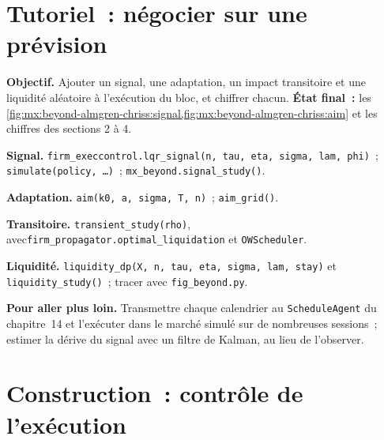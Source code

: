\section{Tutoriel~: négocier sur une prévision}\label{tut:mx:beyond-almgren-chriss:tut}

\begin{tutorial}
\textbf{Objectif.} Ajouter un signal, une adaptation, un impact transitoire et une liquidité aléatoire à l'exécution du bloc, et chiffrer chacun.
\textbf{État final~:} les \cref{fig:mx:beyond-almgren-chriss:signal,fig:mx:beyond-almgren-chriss:aim} et les chiffres des sections 2 à 4.
\begin{tutsteps}
\item \textbf{Signal.} \texttt{firm\_execcontrol.lqr\_signal(n, tau, eta, sigma, lam, phi)}~; \texttt{simulate(policy, \dots)}~; \texttt{mx\_beyond.signal\_study()}.
\item \textbf{Adaptation.} \texttt{aim(k0, a, sigma, T, n)}~; \texttt{aim\_grid()}.
\item \textbf{Transitoire.} \texttt{transient\_study(rho)}, avec\linebreak \texttt{firm\_propagator.optimal\_liquidation} et \texttt{OWScheduler}.
\item \textbf{Liquidité.} \texttt{liquidity\_dp(X, n, tau, eta, sigma, lam, stay)} et \texttt{liquidity\_study()}~; tracer avec \texttt{fig\_beyond.py}.
\end{tutsteps}
\textbf{Pour aller plus loin.} Transmettre chaque calendrier au \texttt{ScheduleAgent} du chapitre~14 et l'exécuter dans le marché simulé sur de nombreuses sessions~; estimer
la dérive du signal avec un filtre de Kalman, au lieu de l'observer.
\end{tutorial}

\section{Construction~: contrôle de l'exécution}\label{bld:mx:beyond-almgren-chriss:execcontrol}

